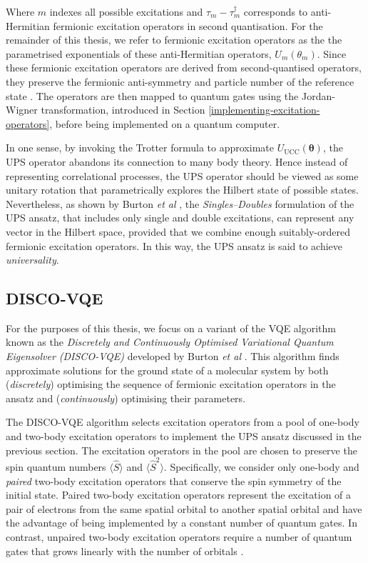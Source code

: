 Where $m$ indexes all possible excitations and $\tau_m - \tau_m^\dagger$ corresponds to anti-Hermitian fermionic excitation operators in second quantisation. For the remainder of this thesis, we refer to fermionic excitation operators as the the parametrised exponentials of these anti-Hermitian operators, $U_m(\theta_m)$. Since these fermionic excitation operators are derived from second-quantised operators, they preserve the fermionic anti-symmetry and particle number of the reference state \cite{Burton2023}. The operators are then mapped to quantum gates using the Jordan-Wigner transformation, introduced in Section \ref{implementing-excitation-operators}, before being implemented on a quantum computer.

In one sense, by invoking the Trotter formula to approximate $U_\text{UCC}(\bm\theta)$, the UPS operator abandons its connection to many body theory. Hence instead of representing correlational processes, the UPS operator should be viewed as some unitary rotation that parametrically explores the Hilbert state of possible states. Nevertheless, as shown by Burton \textit{et al} \cite{Burton2023}, the \textit{Singles--Doubles} formulation of the UPS ansatz, that includes only single and double excitations, can represent any vector in the Hilbert space, provided that we combine enough suitably-ordered fermionic excitation operators. In this way, the UPS ansatz is said to achieve \textit{universality}.


\subsection{DISCO-VQE}%
\label{disco-vqe}

For the purposes of this thesis, we focus on a variant of the VQE algorithm known as the \textit{Discretely and Continuously Optimised Variational Quantum Eigensolver (DISCO-VQE)} developed by Burton \textit{et al} \cite{Burton2023}. This algorithm finds approximate solutions for the ground state of a molecular system by both (\textit{discretely}) optimising the sequence of fermionic excitation operators in the ansatz and (\textit{continuously}) optimising their parameters.

The DISCO-VQE algorithm selects excitation operators from a pool of one-body and two-body excitation operators to implement the UPS ansatz discussed in the previous section. The excitation operators in the pool are chosen to preserve the spin quantum numbers $\langle \hat S \rangle$ and $\langle \hat S^2 \rangle$. Specifically, we consider only one-body and \textit{paired} two-body excitation operators that conserve the spin symmetry of the initial state. Paired two-body excitation operators represent the excitation of a pair of electrons from the same spatial orbital to another spatial orbital and have the advantage of being implemented by a constant number of quantum gates. In contrast, unpaired two-body excitation operators require a number of quantum gates that grows linearly with the number of orbitals \cite{Burton2023}.

